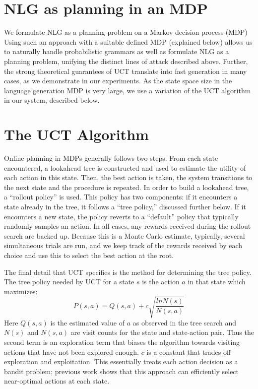 \section{NLG as planning in an MDP}
We formulate NLG as a planning problem on a Markov decision process
(MDP)  Using such an approach with a suitable defined MDP
(explained below) allows us to naturally handle
probabilistic grammars as well as formulate NLG as a planning problem,
unifying the distinct lines of attack described above. Further, the
strong theoretical guarantees of UCT translate into fast generation in
many cases, as we demonstrate in our experiments.
As the state space size in the language generation MDP is
very large, we use a variation of the UCT algorithm in our system,
described below.

\section{The UCT Algorithm}

Online planning in MDPs generally follows two steps. From each state
encountered, a lookahead tree is constructed and used to estimate the
utility of each action in this state. Then, the best action is taken,
the system transitions to the next state and the procedure is
repeated. In order to build a lookahead tree, a ``rollout policy'' is
used. This policy has two components: if it encounters a state already
in the tree, it follows a ``tree policy,'' discussed further below. If
it encounters a new state, the policy reverts to a ``default'' policy
that typically randomly samples an action. In all cases, any rewards
received during the rollout search are backed up. Because this is a
Monte Carlo estimate, typically, several simultaneous trials are run,
and we keep track of the rewards received by each choice and
use this to select the best action at the root.

The final detail that UCT specifies is the method for determining the tree policy.
The tree policy needed by UCT for a state $s$ is the action $a$ in that state which maximizes:
\begin{equation}
P(s,a) = Q(s,a) + c\sqrt{\frac{ln N(s)}{N(s,a)}}\label{eqn:uct}
\end{equation}
Here $Q(s,a)$ is the estimated value of $a$ as observed in the tree
search and $N(s)$ and $N(s,a)$ are visit counts for the state and
state-action pair. Thus the second term is an exploration term that
biases the algorithm towards visiting actions that have not been
explored enough. $c$ is a constant that trades off exploration and
exploitation. This essentially treats each action decision
as a bandit problem; previous work shows that this approach can
efficiently select near-optimal actions at each state.

